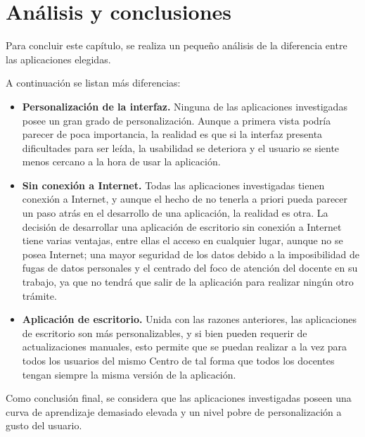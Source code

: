 \section{Análisis y conclusiones}

Para concluir este capítulo, se realiza un pequeño análisis de la diferencia entre las aplicaciones elegidas.

A continuación se listan más diferencias:
\begin{itemize}
\item \textbf{Personalización de la interfaz.} Ninguna de las aplicaciones investigadas posee un gran grado de personalización. Aunque a primera vista podría parecer de poca importancia, la realidad es que si la interfaz presenta dificultades para ser leída, la usabilidad se deteriora y el usuario se siente menos cercano a la hora de usar la aplicación.
\item \textbf{Sin conexión a Internet.} Todas las aplicaciones investigadas tienen conexión a Internet, y aunque el hecho de no tenerla a priori pueda parecer un paso atrás en el desarrollo de una aplicación, la realidad es otra. La decisión de desarrollar una aplicación de escritorio sin conexión a Internet tiene varias ventajas, entre ellas el acceso en cualquier lugar, aunque no se posea Internet; una mayor seguridad de los datos debido a la imposibilidad de fugas de datos personales y el centrado del foco de atención del docente en su trabajo, ya que no tendrá que salir de la aplicación para realizar ningún otro trámite.
\item \textbf{Aplicación de escritorio.} Unida con las razones anteriores, las aplicaciones de escritorio son más personalizables, y si bien pueden requerir de actualizaciones manuales, esto permite que se puedan realizar a la vez para todos los usuarios del mismo Centro de tal forma que todos los docentes tengan siempre la misma versión de la aplicación.
\end{itemize}

Como conclusión final, se considera que las aplicaciones investigadas poseen una curva de aprendizaje demasiado elevada y un nivel pobre de personalización a gusto del usuario.